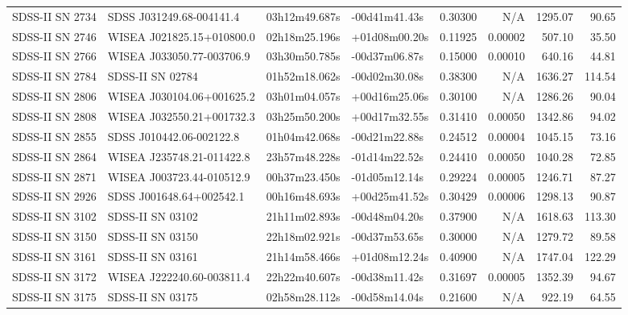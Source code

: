 \begin{longtable}{llllrrrr}
SDSS-II SN 2734  &        SDSS J031249.68-004141.4 &   03h12m49.687s &   -00d41m41.43s &  0.30300 &      N/A &  1295.07 &       90.65 \\
SDSS-II SN 2746  &       WISEA J021825.15+010800.0 &   02h18m25.196s &   +01d08m00.20s &  0.11925 &  0.00002 &   507.10 &       35.50 \\
SDSS-II SN 2766  &       WISEA J033050.77-003706.9 &   03h30m50.785s &   -00d37m06.87s &  0.15000 &  0.00010 &   640.16 &       44.81 \\
SDSS-II SN 2784  &                SDSS-II SN 02784 &   01h52m18.062s &   -00d02m30.08s &  0.38300 &      N/A &  1636.27 &      114.54 \\
SDSS-II SN 2806  &       WISEA J030104.06+001625.2 &   03h01m04.057s &   +00d16m25.06s &  0.30100 &      N/A &  1286.26 &       90.04 \\
SDSS-II SN 2808  &       WISEA J032550.21+001732.3 &   03h25m50.200s &   +00d17m32.55s &  0.31410 &  0.00050 &  1342.86 &       94.02 \\
SDSS-II SN 2855  &        SDSS J010442.06-002122.8 &   01h04m42.068s &   -00d21m22.88s &  0.24512 &  0.00004 &  1045.15 &       73.16 \\
SDSS-II SN 2864  &       WISEA J235748.21-011422.8 &   23h57m48.228s &   -01d14m22.52s &  0.24410 &  0.00050 &  1040.28 &       72.85 \\
SDSS-II SN 2871  &       WISEA J003723.44-010512.9 &   00h37m23.450s &   -01d05m12.14s &  0.29224 &  0.00005 &  1246.71 &       87.27 \\
SDSS-II SN 2926  &        SDSS J001648.64+002542.1 &   00h16m48.693s &   +00d25m41.52s &  0.30429 &  0.00006 &  1298.13 &       90.87 \\
SDSS-II SN 3102  &                SDSS-II SN 03102 &   21h11m02.893s &   -00d48m04.20s &  0.37900 &      N/A &  1618.63 &      113.30 \\
SDSS-II SN 3150  &                SDSS-II SN 03150 &   22h18m02.921s &   -00d37m53.65s &  0.30000 &      N/A &  1279.72 &       89.58 \\
SDSS-II SN 3161  &                SDSS-II SN 03161 &   21h14m58.466s &   +01d08m12.24s &  0.40900 &      N/A &  1747.04 &      122.29 \\
SDSS-II SN 3172  &       WISEA J222240.60-003811.4 &   22h22m40.607s &   -00d38m11.42s &  0.31697 &  0.00005 &  1352.39 &       94.67 \\
SDSS-II SN 3175  &                SDSS-II SN 03175 &   02h58m28.112s &   -00d58m14.04s &  0.21600 &      N/A &   922.19 &       64.55 \\

\end{longtable}
